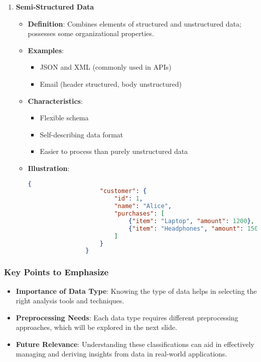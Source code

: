 \documentclass[aspectratio=169]{beamer}
\begin{document}
\begin{frame}[fragile]
\begin{enumerate}
        \item \textbf{Semi-Structured Data}
            \begin{itemize}
                \item \textbf{Definition}: Combines elements of structured and unstructured data; possesses some organizational properties.
                \item \textbf{Examples}:
                    \begin{itemize}
                        \item JSON and XML (commonly used in APIs)
                        \item Email (header structured, body unstructured)
                    \end{itemize}
                \item \textbf{Characteristics}:
                    \begin{itemize}
                        \item Flexible schema
                        \item Self-describing data format
                        \item Easier to process than purely unstructured data
                    \end{itemize}
                \item \textbf{Illustration}:
                \begin{lstlisting}[language=json, title=JSON Example]
                {
                    "customer": {
                        "id": 1,
                        "name": "Alice",
                        "purchases": [
                            {"item": "Laptop", "amount": 1200},
                            {"item": "Headphones", "amount": 150}
                        ]
                    }
                }
                \end{lstlisting}
            \end{itemize}
    \end{enumerate}
\end{frame}

\begin{frame}[fragile]
    \frametitle{Key Points to Emphasize}
    \begin{itemize}
        \item \textbf{Importance of Data Type}: Knowing the type of data helps in selecting the right analysis tools and techniques.
        \item \textbf{Preprocessing Needs}: Each data type requires different preprocessing approaches, which will be explored in the next slide.
        \item \textbf{Future Relevance}: Understanding these classifications can aid in effectively managing and deriving insights from data in real-world applications.
    \end{itemize}
\end{frame}
\end{document}
